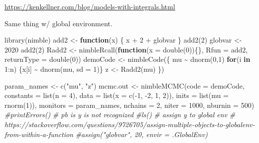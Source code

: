 \documentclass[
  12pt,
]{krantz}
\newenvironment{Shaded}{\begin{snugshade}}{\end{snugshade}}
\newcommand{\AttributeTok}[1]{\textcolor[rgb]{0.77,0.63,0.00}{#1}}
\newcommand{\CommentTok}[1]{\textcolor[rgb]{0.56,0.35,0.01}{\textit{#1}}}
\newcommand{\ControlFlowTok}[1]{\textcolor[rgb]{0.13,0.29,0.53}{\textbf{#1}}}
\newcommand{\DecValTok}[1]{\textcolor[rgb]{0.00,0.00,0.81}{#1}}
\newcommand{\FunctionTok}[1]{\textcolor[rgb]{0.00,0.00,0.00}{#1}}
\newcommand{\NormalTok}[1]{#1}
\newcommand{\OtherTok}[1]{\textcolor[rgb]{0.56,0.35,0.01}{#1}}
\newcommand{\SpecialCharTok}[1]{\textcolor[rgb]{0.00,0.00,0.00}{#1}}
\newcommand{\StringTok}[1]{\textcolor[rgb]{0.31,0.60,0.02}{#1}}
\begin{document}
\url{https://kenkellner.com/blog/models-with-integrals.html}

Same thing w/ global environment.

\begin{Shaded}
\begin{Highlighting}[]
\FunctionTok{library}\NormalTok{(nimble)}
\NormalTok{add2 }\OtherTok{\textless{}{-}} \ControlFlowTok{function}\NormalTok{(x) \{}
\NormalTok{   x }\SpecialCharTok{+} \DecValTok{2} \SpecialCharTok{+}\NormalTok{ globvar}
\NormalTok{\}}
\FunctionTok{add2}\NormalTok{(}\DecValTok{2}\NormalTok{)}
\NormalTok{globvar }\OtherTok{\textless{}{-}} \DecValTok{2020}
\FunctionTok{add2}\NormalTok{(}\DecValTok{2}\NormalTok{)}
\NormalTok{Radd2 }\OtherTok{\textless{}{-}} \FunctionTok{nimbleRcall}\NormalTok{(}\ControlFlowTok{function}\NormalTok{(}\AttributeTok{x =} \FunctionTok{double}\NormalTok{(}\DecValTok{0}\NormalTok{))\{\}, }
                     \AttributeTok{Rfun =} \StringTok{\textquotesingle{}add2\textquotesingle{}}\NormalTok{,}
                     \AttributeTok{returnType =} \FunctionTok{double}\NormalTok{(}\DecValTok{0}\NormalTok{))}
\NormalTok{demoCode }\OtherTok{\textless{}{-}} \FunctionTok{nimbleCode}\NormalTok{(\{}
\NormalTok{  mu }\SpecialCharTok{\textasciitilde{}} \FunctionTok{dnorm}\NormalTok{(}\DecValTok{0}\NormalTok{,}\DecValTok{1}\NormalTok{)}
  \ControlFlowTok{for}\NormalTok{(i }\ControlFlowTok{in} \DecValTok{1}\SpecialCharTok{:}\NormalTok{n) \{x[i] }\SpecialCharTok{\textasciitilde{}} \FunctionTok{dnorm}\NormalTok{(mu, }\AttributeTok{sd =} \DecValTok{1}\NormalTok{)\} }
\NormalTok{  z }\OtherTok{\textless{}{-}} \FunctionTok{Radd2}\NormalTok{(mu)}
\NormalTok{\})}

\NormalTok{param\_names }\OtherTok{\textless{}{-}} \FunctionTok{c}\NormalTok{(}\StringTok{"mu"}\NormalTok{, }\StringTok{"z"}\NormalTok{)}
\NormalTok{mcmc.out }\OtherTok{\textless{}{-}} \FunctionTok{nimbleMCMC}\NormalTok{(}\AttributeTok{code =}\NormalTok{ demoCode, }
                       \AttributeTok{constants =} \FunctionTok{list}\NormalTok{(}\AttributeTok{n =} \DecValTok{4}\NormalTok{),}
                       \AttributeTok{data =} \FunctionTok{list}\NormalTok{(}\AttributeTok{x =} \FunctionTok{c}\NormalTok{(}\SpecialCharTok{{-}}\DecValTok{1}\NormalTok{, }\SpecialCharTok{{-}}\DecValTok{2}\NormalTok{, }\DecValTok{1}\NormalTok{, }\DecValTok{2}\NormalTok{)), }
                       \AttributeTok{inits =} \FunctionTok{list}\NormalTok{(}\AttributeTok{mu =} \FunctionTok{rnorm}\NormalTok{(}\DecValTok{1}\NormalTok{)),}
                       \AttributeTok{monitors =}\NormalTok{ param\_names,}
                       \AttributeTok{nchains =} \DecValTok{2}\NormalTok{, }
                       \AttributeTok{niter =} \DecValTok{1000}\NormalTok{,}
                       \AttributeTok{nburnin =} \DecValTok{500}\NormalTok{)}
\CommentTok{\#printErrors()}
\CommentTok{\# pb is y is not recognized}
\CommentTok{\#ls()}
\CommentTok{\# assign y to global env}
\CommentTok{\# https://stackoverflow.com/questions/9726705/assign{-}multiple{-}objects{-}to{-}globalenv{-}from{-}within{-}a{-}function}
\CommentTok{\#assign("globvar", 20, envir = .GlobalEnv)}


\end{Highlighting}
\end{Shaded}
\end{document}
